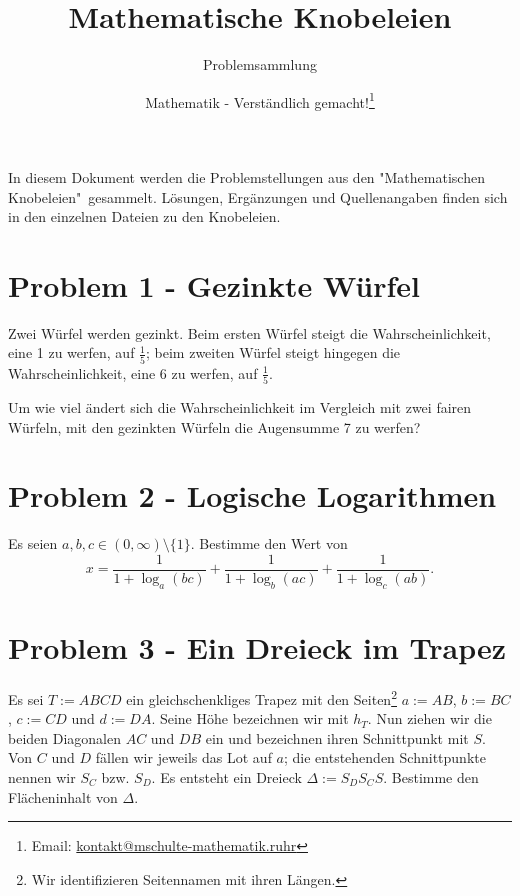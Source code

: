 \documentclass[]{scrartcl}
\title{Mathematische Knobeleien}
\subtitle{Problemsammlung}
\author{Mathematik - Verständlich gemacht!\footnote{Email: \href{mailto:kontakt@mschulte-mathematik.ruhr}{kontakt@mschulte-mathematik.ruhr}}}
\begin{document}
\maketitle

\noindent 
In diesem Dokument werden die Problemstellungen aus den 
"Mathematischen Knobeleien"\ gesammelt. Lösungen,
Ergänzungen und Quellenangaben finden sich in den einzelnen
Dateien zu den Knobeleien.

\section*{Problem 1 - Gezinkte Würfel}
Zwei Würfel werden gezinkt. Beim ersten Würfel steigt die Wahrscheinlichkeit, eine 1 zu
werfen, auf $\frac{1}{5}$; beim zweiten Würfel steigt hingegen die Wahrscheinlichkeit, eine 6
zu werfen, auf $\frac{1}{5}$.

\noindent 
Um wie viel ändert sich die Wahrscheinlichkeit im Vergleich mit zwei fairen Würfeln, mit den
gezinkten Würfeln die Augensumme 7 zu werfen?

\section*{Problem 2 - Logische Logarithmen}
Es seien $a,b,c \in (0,\infty) \setminus \{1\}$. Bestimme den Wert von
$$
x = \frac{1}{1+\log_a(bc)} + \frac{1}{1+\log_b(ac)} + \frac{1}{1+\log_c(ab)}.
$$

\section*{Problem 3 - Ein Dreieck im Trapez}
Es sei $T:=ABCD$ ein gleichschenkliges Trapez mit den 
Seiten\footnote{Wir identifizieren Seitennamen mit ihren 
Längen.} $a:=AB$, $b:=BC$, $c:=CD$ und $d:=DA$. Seine Höhe
bezeichnen wir mit $h_T$. Nun ziehen wir die
beiden Diagonalen $AC$ und $DB$ ein und bezeichnen ihren 
Schnittpunkt mit $S$. Von $C$ und $D$ fällen wir jeweils das
Lot auf $a$; die entstehenden Schnittpunkte nennen wir $S_C$ bzw.
$S_D$. Es entsteht ein Dreieck $\Delta := S_DS_CS$. 
Bestimme den Flächeninhalt von $\Delta$.
\end{document}
